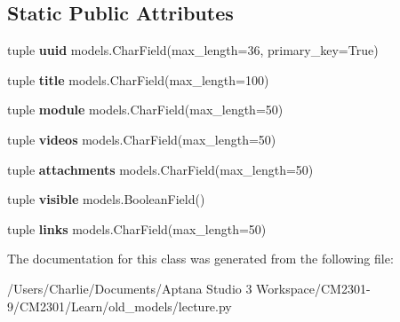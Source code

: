 \subsection*{Static Public Attributes}
\begin{DoxyCompactItemize}
\item 
\hypertarget{class_learn_1_1old__models_1_1lecture_1_1_lecture_a0fe1bfb4370a4c4cd31150e893b76b89}{tuple {\bfseries uuid} models.\-Char\-Field(max\-\_\-length=36, primary\-\_\-key=True)}\label{class_learn_1_1old__models_1_1lecture_1_1_lecture_a0fe1bfb4370a4c4cd31150e893b76b89}

\item 
\hypertarget{class_learn_1_1old__models_1_1lecture_1_1_lecture_af8a037e83af9421629c045ecfa4411ca}{tuple {\bfseries title} models.\-Char\-Field(max\-\_\-length=100)}\label{class_learn_1_1old__models_1_1lecture_1_1_lecture_af8a037e83af9421629c045ecfa4411ca}

\item 
\hypertarget{class_learn_1_1old__models_1_1lecture_1_1_lecture_a0e7d2f600ceb875b40573b44e32d8de2}{tuple {\bfseries module} models.\-Char\-Field(max\-\_\-length=50)}\label{class_learn_1_1old__models_1_1lecture_1_1_lecture_a0e7d2f600ceb875b40573b44e32d8de2}

\item 
\hypertarget{class_learn_1_1old__models_1_1lecture_1_1_lecture_ad1bd86b9f846efc920bcef702f401575}{tuple {\bfseries videos} models.\-Char\-Field(max\-\_\-length=50)}\label{class_learn_1_1old__models_1_1lecture_1_1_lecture_ad1bd86b9f846efc920bcef702f401575}

\item 
\hypertarget{class_learn_1_1old__models_1_1lecture_1_1_lecture_ae23d7c625e9061602e171cd0ec39a748}{tuple {\bfseries attachments} models.\-Char\-Field(max\-\_\-length=50)}\label{class_learn_1_1old__models_1_1lecture_1_1_lecture_ae23d7c625e9061602e171cd0ec39a748}

\item 
\hypertarget{class_learn_1_1old__models_1_1lecture_1_1_lecture_a27c4fbb26f3f904948e470261339e437}{tuple {\bfseries visible} models.\-Boolean\-Field()}\label{class_learn_1_1old__models_1_1lecture_1_1_lecture_a27c4fbb26f3f904948e470261339e437}

\item 
\hypertarget{class_learn_1_1old__models_1_1lecture_1_1_lecture_aef2e743687f525490951c670637b6715}{tuple {\bfseries links} models.\-Char\-Field(max\-\_\-length=50)}\label{class_learn_1_1old__models_1_1lecture_1_1_lecture_aef2e743687f525490951c670637b6715}

\end{DoxyCompactItemize}


The documentation for this class was generated from the following file\-:\begin{DoxyCompactItemize}
\item 
/\-Users/\-Charlie/\-Documents/\-Aptana Studio 3 Workspace/\-C\-M2301-\/9/\-C\-M2301/\-Learn/old\-\_\-models/lecture.\-py\end{DoxyCompactItemize}
